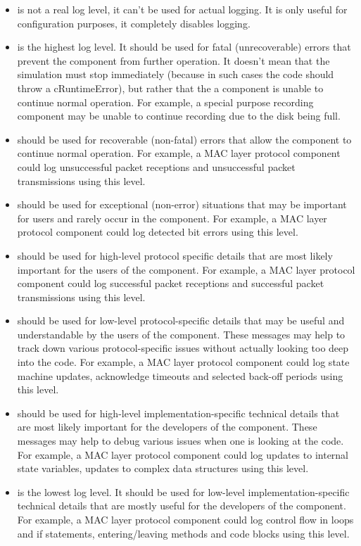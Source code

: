 \begin{itemize}
  \item {} is not a real log level, it can't be used for actual
    logging. It is only useful for configuration purposes, it completely disables
    logging.
  \item {} is the highest log level. It should be used for
    fatal (unrecoverable) errors that prevent the component from further
    operation. It doesn't mean that the simulation must stop immediately
    (because in such cases the code should throw a cRuntimeError), but rather
    that the a component is unable to continue normal operation. For example, a
    special purpose recording component may be unable to continue recording due
    to the disk being full.
  \item {} should be used for recoverable (non-fatal)
    errors that allow the component to continue normal operation. For example,
    a MAC layer protocol component could log unsuccessful packet receptions and
    unsuccessful packet transmissions using this level.
  \item {} should be used for exceptional (non-error)
    situations that may be important for users and rarely occur in the
    component. For example, a MAC layer protocol component could log detected
    bit errors using this level.
  \item {} should be used for high-level protocol specific
    details that are most likely important for the users of the component. For
    example, a MAC layer protocol component could log successful packet
    receptions and successful packet transmissions using this level.
  \item {} should be used for low-level protocol-specific
    details that may be useful and understandable by the users of the component.
    These messages may help to track down various protocol-specific issues
    without actually looking too deep into the code. For example, a MAC layer
    protocol component could log state machine updates, acknowledge timeouts
    and selected back-off periods using this level.
  \item {} should be used for high-level
    implementation-specific technical details that are most likely important
    for the developers of the component. These messages may help to debug
    various issues when one is looking at the code. For example, a MAC layer
    protocol component could log updates to internal state variables, updates
    to complex data structures using this level.
  \item {} is the lowest log level. It should be used for
    low-level implementation-specific technical details that are mostly useful
    for the developers of the component. For example, a MAC layer protocol
    component could log control flow in loops and if statements,
    entering/leaving methods and code blocks using this level.
\end{itemize}

